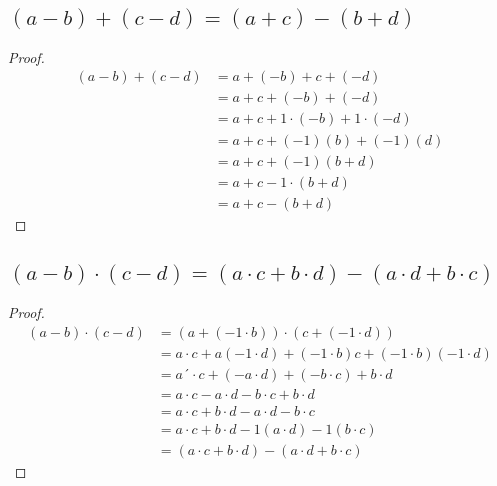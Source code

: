 \documentclass[12pt]{article}
\begin{document}
	    \subsection{$ (a-b) + (c-d) = (a+c)-(b+d)$}
	        \begin{proof}
	          \begin{align}
	          \tag{Por definición de resta} (a-b)+(c-d) &= a+(-b)+c+(-d) \\
	          \tag{Conmutatividad} &= a+c+(-b)+(-d) \\
	          \tag{Neutro Multiplicativo} &= a+c+1 \cdot (-b) + 1 \cdot (-d) \\
	            \tag{Por 2.4} &= a+c + (-1)(b) +(-1)(d) \\
	            \tag{Distributividad} &= a+c+(-1)(b+d) \\
	            \tag{Por definición} &= a+c-1 \cdot (b+d) \\
	            \tag{Neutro multiplicativo} &= a+c -(b+d)
	          \end{align}
	          \blacksquare
	        \end{proof}
	    \subsection{$(a-b)\cdot(c-d) = (a \cdot c+b \cdot d)-(a \cdot d +b \cdot c)$}
	        \begin{proof}
	          \begin{align}
	              \tag{Por 2.5 y definición de resta}(a-b)\cdot(c-d) &= (a+(-1\cdot b))\cdot (c+(-1 \cdot d)) \\
	              \tag{Distributividad y definición de producto} &= a \cdot c + a(-1\cdot d) +(-1\cdot b)c+(-1\cdot b)(-1\cdot d) \\
	              \tag{Distributividad en los paréntesis} &= a ´\cdot c + (-a \cdot d) +(-b \cdot c) + b \cdot d\\
	              \tag{Por definición de resta} &= a \cdot c - a \cdot d - b \cdot c + b \cdot d\\
	              \tag{Conmutatividad} &= a \cdot c + b \cdot d - a \cdot d - b \cdot c \\
	              \tag{Por 2.4} &= a \cdot c + b \cdot d -1(a \cdot d) -1(b \cdot c) \\
	              \tag{Distributividad} &= (a \cdot c + b \cdot d ) -( a \cdot d + b \cdot c)
	          \end{align}
	          \blacksquare
        	\end{proof}
\end{document}

